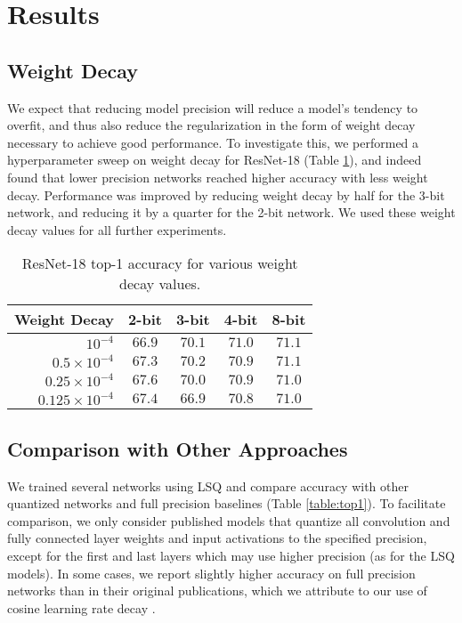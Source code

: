 \documentclass{article}
\begin{document}
\section{Results}


\subsection{Weight Decay}

We expect that reducing model precision will reduce a model's tendency to overfit, and thus also reduce the regularization in the form of weight decay necessary to achieve good performance.
To investigate this, we performed a hyperparameter sweep on weight decay for ResNet-18 (Table  \ref{table:weightdecay}),
and indeed found that lower precision networks reached higher accuracy with less weight decay.
Performance was improved by reducing weight decay by half for the 3-bit network, and reducing it by a quarter for the 2-bit network. We used these weight decay values for all further experiments.

\begin{table}[h]
	\caption{ResNet-18 top-1 accuracy for various weight decay values.}
	\label{table:weightdecay}
	\setlength\tabcolsep{6pt}
\begin{center}
	\begin{small}
\begin{tabular}{r c c c c}
Weight Decay & 2-bit & 3-bit & 4-bit & 8-bit \\
		\midrule
		$10^{-4}$ 				& $66.9$ 			& $70.1$ 			& $\mathbf{71.0}$	& $\mathbf{71.1}$ \\
		$0.5 \times 10^{-4}$ 		& $67.3$ 			& $\mathbf{70.2}$ 	& $70.9$			& $71.1$ \\
		$0.25 \times 10^{-4}$ 	& $\mathbf{67.6}$ 	& $70.0$ 			& $70.9$ 			& $71.0$ \\
		$0.125 \times 10^{-4}$ 	& $67.4$ 			& $66.9$ 			& $70.8$ 			& $71.0$ \\
		\bottomrule
	\end{tabular}
\end{small}
	\end{center}
\end{table}


\subsection{Comparison with Other Approaches}

We trained several networks using LSQ and compare accuracy with other quantized networks and full precision baselines (Table \ref{table:top1}).
To facilitate comparison, we only consider published models that quantize all convolution and fully connected layer weights and input activations to the specified precision, except for the first and last layers which may use higher precision (as for the LSQ models).
In some cases, we report slightly higher accuracy on full precision networks than in their original publications, which we attribute to our use of cosine learning rate decay \citep{DBLP:journals/corr/LoshchilovH16a}.
\end{document}
